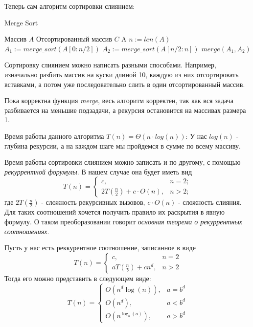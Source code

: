 \documentclass[../main.tex]{subfiles}
\begin{document}
	Теперь сам алгоритм сортировки слиянием:
	\begin{algorithm}[H]
		\caption{Merge Sort}
		\begin{algorithmic}[1]
			\Require Массив $A$
			\Ensure Отсортированный массив $C$
					\State \Return A
				\Else
					\State $n := len(A)$
					\State $A_1 := merge\_sort(A[0: n/2])$
					\State $A_2 := merge\_sort(A[n/2: n])$
					\State \Return $merge(A_1, A_2)$
				\EndIf
		
			\EndFunction
		\end{algorithmic}
	\end{algorithm}
	\begin{remark}
		Сортировку слиянием можно написать разными способами. Например, изначально разбить массив на куски длиной 10, каждую из них отсортировать вставками, а потом уже последовательно слить в один отсортированный массив.
	\end{remark}
	\begin{proof_cor}
		Пока корректна функция \textit{merge}, весь алгоритм корректен, так как вся задача разбивается на меньшие подзадачи, а рекурсия остановится на массивах размера 1.
	\end{proof_cor}
	\begin{time}
		Время работы данного алгоритма $T(n) = \Theta(n\cdot log(n))$: У нас $log(n)$ - глубина рекурсии, а на каждом шаге мы пройдемся в сумме по всему массиву.
	\end{time} 
	
	
	Время работы сортировки слиянием можно записать и по-другому, с помощью \textit{рекуррентной форумулы}. В нашем случае она будет иметь вид
	\[
	T(n) = 
	\begin{cases}
		c, & n = 2; \\
		2T(\frac{n}{2}) + c \cdot O(n), & n > 2;
	\end{cases}
	\]
	где $2T(\frac{n}{2})$ - сложность рекурсивных вызовов, $c \cdot O(n)$ - сложность слияния. Для таких соотношений хочется получить правило их раскрытия в явную формулу. О таком преоборазовании говорит \textit{основная теорема о рекуррентных соотношениях}.
	
	\begin{theorem}
		Пусть у нас есть реккурентное соотношение, записанное в виде
		\[
		T(n) = 
		\begin{cases}
		c, & n = 2\\
		aT(\frac{n}{b}) + cn^d, & n > 2
		\end{cases}
		\]
		Тогда его можно представить в следующем виде:
		\[
		T(n) = 
		\begin{cases}
		O(n^d \log(n)), & a = b^d \\
		O(n^d), & a < b^d \\
		O(n^{\log_b(a)}), & a > b^d
		\end{cases}
		\]
	\end{theorem}
	
\end{document}

